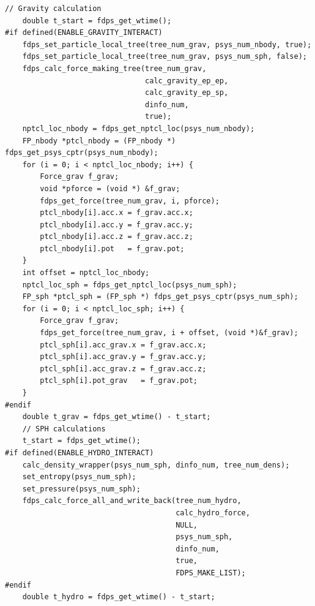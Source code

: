 \endifFtn
\ifC %
\begin{lstlisting}[caption=相互作用計算の実行]
    // Gravity calculation
    double t_start = fdps_get_wtime();
#if defined(ENABLE_GRAVITY_INTERACT)
    fdps_set_particle_local_tree(tree_num_grav, psys_num_nbody, true);
    fdps_set_particle_local_tree(tree_num_grav, psys_num_sph, false);
    fdps_calc_force_making_tree(tree_num_grav,
                                calc_gravity_ep_ep,
                                calc_gravity_ep_sp,
                                dinfo_num,
                                true);
    nptcl_loc_nbody = fdps_get_nptcl_loc(psys_num_nbody);
    FP_nbody *ptcl_nbody = (FP_nbody *) fdps_get_psys_cptr(psys_num_nbody);
    for (i = 0; i < nptcl_loc_nbody; i++) {
        Force_grav f_grav;
        void *pforce = (void *) &f_grav;
        fdps_get_force(tree_num_grav, i, pforce);
        ptcl_nbody[i].acc.x = f_grav.acc.x;
        ptcl_nbody[i].acc.y = f_grav.acc.y;
        ptcl_nbody[i].acc.z = f_grav.acc.z;
        ptcl_nbody[i].pot   = f_grav.pot;
    }
    int offset = nptcl_loc_nbody;
    nptcl_loc_sph = fdps_get_nptcl_loc(psys_num_sph);
    FP_sph *ptcl_sph = (FP_sph *) fdps_get_psys_cptr(psys_num_sph);
    for (i = 0; i < nptcl_loc_sph; i++) {
        Force_grav f_grav;
        fdps_get_force(tree_num_grav, i + offset, (void *)&f_grav);
        ptcl_sph[i].acc_grav.x = f_grav.acc.x;
        ptcl_sph[i].acc_grav.y = f_grav.acc.y;
        ptcl_sph[i].acc_grav.z = f_grav.acc.z;
        ptcl_sph[i].pot_grav   = f_grav.pot;
    }
#endif
    double t_grav = fdps_get_wtime() - t_start;
    // SPH calculations
    t_start = fdps_get_wtime();
#if defined(ENABLE_HYDRO_INTERACT)
    calc_density_wrapper(psys_num_sph, dinfo_num, tree_num_dens);
    set_entropy(psys_num_sph);
    set_pressure(psys_num_sph);
    fdps_calc_force_all_and_write_back(tree_num_hydro,
                                       calc_hydro_force,
                                       NULL,
                                       psys_num_sph,
                                       dinfo_num,
                                       true,
                                       FDPS_MAKE_LIST);
#endif
    double t_hydro = fdps_get_wtime() - t_start;
\end{lstlisting}
\endifC

